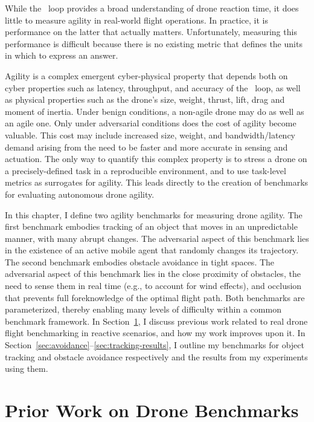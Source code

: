 While the \ooda~loop provides a broad understanding of drone reaction time, it does little to measure agility in real-world flight operations. In practice, it is performance on the latter that actually matters. Unfortunately, measuring this performance is difficult because there is no existing metric that defines the units in which to express an answer.

Agility is a complex emergent cyber-physical property that depends
both on cyber properties such as latency, throughput, and accuracy of
the \ooda~loop, as well as physical properties such as the drone's
size, weight, thrust, lift, drag and moment of inertia.  Under benign
conditions, a non-agile drone may do as well as an agile one.  Only
under adversarial conditions does the cost of agility become valuable.
This cost may include increased size, weight, and bandwidth/latency
demand arising from the need to be faster and more accurate in sensing
and actuation.  The only way to quantify this complex property is to
stress a drone on a precisely-defined task in a reproducible
environment, and to use task-level metrics as surrogates for agility.
This leads directly to the creation of benchmarks for evaluating
autonomous drone agility.

In this chapter, I define two agility benchmarks for measuring drone agility. The first benchmark embodies tracking of an object that moves in an unpredictable manner, with many abrupt changes. The adversarial aspect of this benchmark lies in the existence of an active mobile agent that randomly changes its trajectory. The second benchmark embodies obstacle avoidance in tight spaces. The adversarial aspect of this benchmark lies in the close proximity of obstacles, the need to sense them in real time (e.g., to account for wind effects), and occlusion that prevents full foreknowledge of the optimal flight path.  Both benchmarks are parameterized, thereby enabling many levels of difficulty within a common benchmark framework. In Section~\ref{sec:prior-work-benchmarks}, I discuss previous work related to real drone flight benchmarking in reactive scenarios, and how my work improves upon it. In Section~\ref{sec:avoidance}--\ref{sec:tracking-results}, I outline my benchmarks for object tracking and obstacle avoidance respectively and the results from my experiments using them.

\section{Prior Work on Drone Benchmarks}
\label{sec:prior-work-benchmarks}

